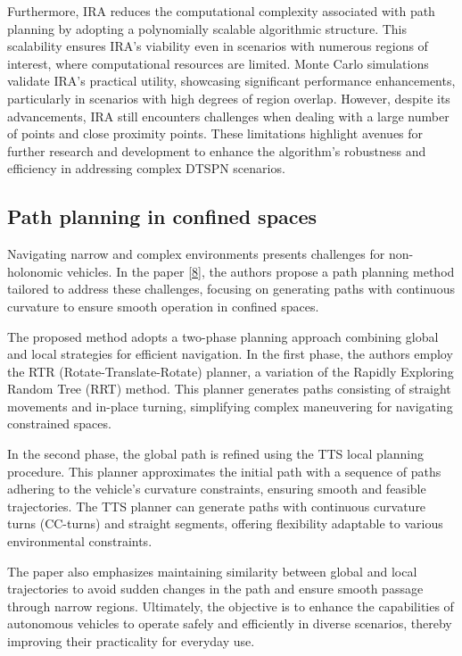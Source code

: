 \vspace{3mm}

Furthermore, IRA reduces the computational complexity associated with path planning by adopting a polynomially scalable algorithmic structure. This scalability ensures IRA's viability even in scenarios with numerous regions of interest, where computational resources are limited. Monte Carlo simulations validate IRA's practical utility, showcasing significant performance enhancements, particularly in scenarios with high degrees of region overlap. However, despite its advancements, IRA still encounters challenges when dealing with a large number of points and close proximity points. These limitations highlight avenues for further research and development to enhance the algorithm's robustness and efficiency in addressing complex DTSPN scenarios.








\subsection{Path planning in confined spaces}


Navigating narrow and complex environments presents challenges for non-holonomic vehicles. In the paper \hyperlink{cite.mapping}{[8]}, the authors propose a path planning method tailored to address these challenges, focusing on generating paths with continuous curvature to ensure smooth operation in confined spaces.

\vspace{3mm}

The proposed method adopts a two-phase planning approach combining global and local strategies for efficient navigation. In the first phase, the authors employ the RTR (Rotate-Translate-Rotate) planner, a variation of the Rapidly Exploring Random Tree (RRT) method. This planner generates paths consisting of straight movements and in-place turning, simplifying complex maneuvering for navigating constrained spaces.

\vspace{3mm}

In the second phase, the global path is refined using the TTS local planning procedure. This planner approximates the initial path with a sequence of paths adhering to the vehicle's curvature constraints, ensuring smooth and feasible trajectories. The TTS planner can generate paths with continuous curvature turns (CC-turns) and straight segments, offering flexibility adaptable to various environmental constraints.

\vspace{3mm}

The paper also emphasizes maintaining similarity between global and local trajectories to avoid sudden changes in the path and ensure smooth passage through narrow regions. Ultimately, the objective is to enhance the capabilities of autonomous vehicles to operate safely and efficiently in diverse scenarios, thereby improving their practicality for everyday use.

